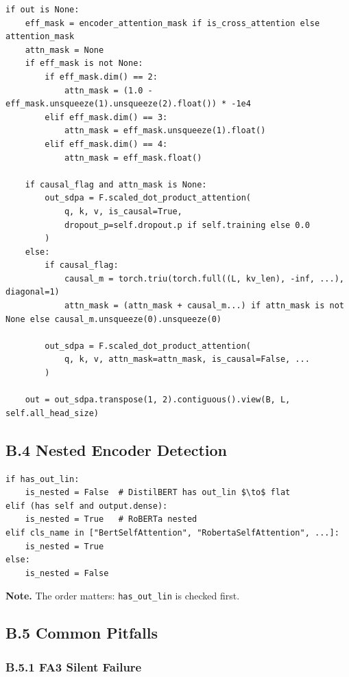 \begin{lstlisting}
if out is None:
    eff_mask = encoder_attention_mask if is_cross_attention else attention_mask
    attn_mask = None
    if eff_mask is not None:
        if eff_mask.dim() == 2:
            attn_mask = (1.0 - eff_mask.unsqueeze(1).unsqueeze(2).float()) * -1e4
        elif eff_mask.dim() == 3:
            attn_mask = eff_mask.unsqueeze(1).float()
        elif eff_mask.dim() == 4:
            attn_mask = eff_mask.float()
    
    if causal_flag and attn_mask is None:
        out_sdpa = F.scaled_dot_product_attention(
            q, k, v, is_causal=True, 
            dropout_p=self.dropout.p if self.training else 0.0
        )
    else:
        if causal_flag:
            causal_m = torch.triu(torch.full((L, kv_len), -inf, ...), diagonal=1)
            attn_mask = (attn_mask + causal_m...) if attn_mask is not None else causal_m.unsqueeze(0).unsqueeze(0)
        
        out_sdpa = F.scaled_dot_product_attention(
            q, k, v, attn_mask=attn_mask, is_causal=False, ...
        )
    
    out = out_sdpa.transpose(1, 2).contiguous().view(B, L, self.all_head_size)
\end{lstlisting}

\subsection{B.4 Nested Encoder Detection}

\begin{lstlisting}
if has_out_lin:
    is_nested = False  # DistilBERT has out_lin $\to$ flat
elif (has self and output.dense):
    is_nested = True   # RoBERTa nested
elif cls_name in ["BertSelfAttention", "RobertaSelfAttention", ...]:
    is_nested = True
else:
    is_nested = False
\end{lstlisting}

\textbf{Note.} The order matters: \texttt{has\_out\_lin} is checked first.

\subsection{B.5 Common Pitfalls}

\subsubsection{B.5.1 FA3 Silent Failure}

